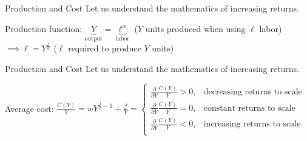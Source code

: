 \documentclass[notes,11pt, aspectratio=169, xcolor=table]{beamer}
\newenvironment{wideitemize}{\itemize\addtolength{\itemsep}{10pt}}{\enditemize}
\begin{document}
\begin{frame}{Production and Cost}
\Large Let us understand the mathematics of increasing returns.
\normalsize
\begin{wideitemize}
    \item Production function: $\underbrace{Y}_{\text{output}} = \underbrace{\ell^\alpha}_{\text{labor}}$ ($Y$ units produced when using $\ell$ labor) \\ $\implies \ell = Y^{\frac{1}{\alpha}}$ ($\ell$ required to produce $Y$ units)
\end{wideitemize}


\end{frame}




\begin{frame}{Production and Cost}
\Large Let us understand the mathematics of increasing returns.
\normalsize
\begin{wideitemize}
    \item Average cost: $\frac{C(Y)}{Y} = w Y^{\frac{1}{\alpha} - 1}  + \frac{\bar{f}}{Y} = \begin{cases} \frac{\partial }{\partial Y} \frac{C(Y)}{Y} > 0, & \text{decreasing returns to scale} \\ \frac{\partial }{\partial Y} \frac{C(Y)}{Y} = 0, & \text{constant returns to scale} \\
    \frac{\partial }{\partial Y} \frac{C(Y)}{Y} < 0, & \text{increasing returns to scale} \\
\end{cases}$ 

\end{wideitemize}


\end{frame}
\end{document}

